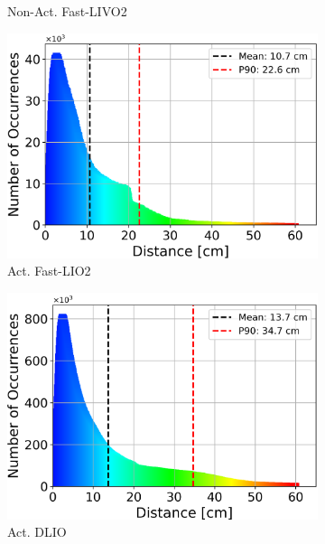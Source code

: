 \documentclass[conference]{IEEEtran}
\begin{document}
\begin{figure}[htbp]
\begin{subfigure}{0.18\textwidth}
    \caption{Non-Act. Fast-LIVO2}
    \label{fig:hist_non_livo}
\end{subfigure}
\hfill
\begin{subfigure}{0.18\textwidth}
    \centering
    \includegraphics[width=\textwidth]{pics/histogram_results/histogram_cond_actuated_lio.png}
    \caption{Act. Fast-LIO2}
    \label{fig:hist_act_lio}
\end{subfigure}
\hfill
\begin{subfigure}{0.18\textwidth}
    \centering
    \includegraphics[width=\textwidth]{pics/histogram_results/histogram_cond_actuated_dlio.png}
    \caption{Act. DLIO}
    \label{fig:hist_act_dlio}
\end{subfigure}
\hfill
\begin{subfigure}{0.18\textwidth}

\end{subfigure}
\end{figure}
\end{document}
